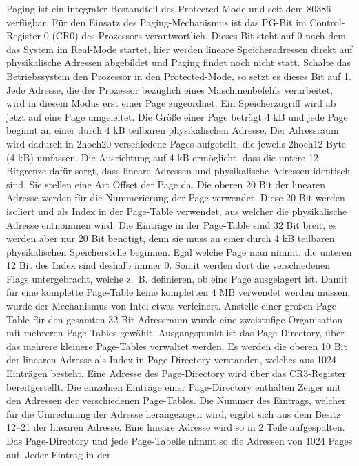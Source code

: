 \documentclass[12pt]{book}
\begin{document}
Paging ist ein integraler Bestandteil des Protected Mode und seit dem 80386
verfügbar. Für den Einsatz des Paging-Mechanismus ist das PG-Bit im
Control-Register 0 (CR0) des Prozessors verantwortlich. Dieses Bit steht auf 0
nach dem das System im Real-Mode startet, hier werden lineare Speicheradressen
direkt auf physikalische Adressen abgebildet und Paging findet noch nicht statt.
Schalte das Betriebssystem den Prozessor in den Protected-Mode, so setzt es
dieses Bit auf 1. Jede Adresse, die der Prozessor bezüglich eines
Maschinenbefehls verarbeitet, wird in diesem Modus erst einer Page zugeordnet.
Ein Speicherzugriff wird ab jetzt auf eine Page umgeleitet. Die Größe einer Page
beträgt 4 kB und jede Page beginnt an einer durch 4 kB teilbaren physikalischen
Adresse. Der Adressraum wird dadurch in 2hoch20 verschiedene Pages aufgeteilt, die
jeweils 2hoch12 Byte (4 kB) umfassen. Die Ausrichtung auf 4 kB ermöglicht, dass die
untere 12 Bitgrenze dafür sorgt, dass lineare Adressen und physikalische
Adressen identisch sind. Sie stellen eine Art Offset der Page da. Die oberen 20
Bit der linearen Adresse werden für die Nummerierung der Page verwendet. Diese
20 Bit werden isoliert und als Index in der Page-Table verwendet, aus welcher
die physikalische Adresse entnommen wird. Die Einträge in der Page-Table sind 32
Bit breit, es werden aber nur 20 Bit benötigt, denn sie muss an einer durch 4 kB
teilbaren physikalischen Speicherstelle beginnen. Egal welche Page man nimmt,
die unteren 12 Bit des Index sind deshalb immer 0. Somit werden dort die
verschiedenen Flags untergebracht, welche z. B. definieren, ob eine Page
ausgelagert ist. Damit für eine komplette Page-Table keine kompletten 4 MB
verwendet werden müssen, wurde der Mechanismus von Intel etwas verfeinert.
Anstelle einer großen Page-Table für den gesamten 32-Bit-Adressraum wurde eine
zweistufige Organisation mit mehreren Page-Tables gewählt. Ausgangspunkt ist das
Page-Directory, über das mehrere kleinere Page-Tables verwaltet werden. Es
werden die oberen 10 Bit der linearen Adresse als Index in Page-Directory
verstanden, welches aus 1024 Einträgen besteht. Eine Adresse des Page-Directory
wird über das CR3-Register bereitgestellt. Die einzelnen Einträge einer
Page-Directory enthalten Zeiger mit den Adressen der verschiedenen Page-Tables.
Die Nummer des Eintrags, welcher für die Umrechnung der Adresse herangezogen
wird, ergibt sich aus dem Besitz 12–21 der linearen Adresse. Eine lineare
Adresse wird so in 2 Teile aufgespalten. Das Page-Directory und jede
Page-Tabelle nimmt so die Adressen von 1024 Pages auf. Jeder Eintrag in der
\end{document}
